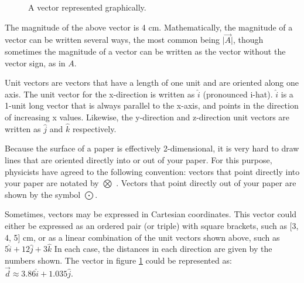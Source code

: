 \begin{figure}[h]
	\caption{A vector represented graphically.} \label{figure:M1}
	\centering
	
\end{figure}


	
	
	



	
	The magnitude of the above vector is 4 cm.  Mathematically, the magnitude of a vector can be written several ways, the most common being $\lvert \vec{A} \rvert$, though sometimes the magnitude of a vector can be written as the vector without the vector sign, as in $A$. 
	
	Unit vectors are vectors that have a length of one unit and are oriented along one axis.  The unit vector for the x-direction is written as $\hat{i}$ (pronounced i-hat).  $\hat{i}$ is a 1-unit long vector that is always parallel to the x-axis, and points in the direction of increasing x values.  Likewise, the y-direction and z-direction unit vectors are written as $\hat{j}$ and $\hat{k}$ respectively.  
	
	
	Because the surface of a paper is effectively 2-dimensional, it is very hard to draw lines that are oriented directly into or out of your paper. For this purpose, physicists have agreed to the following convention: vectors that point directly into your paper are notated by $\bigotimes$ .  Vectors that point directly out of your paper are shown by the symbol $\bigodot$.  
	
	Sometimes, vectors may be expressed in Cartesian coordinates.  This vector could either be expressed as an ordered pair (or triple) with square brackets, such as [3, 4, 5] cm, or as a linear combination of the unit vectors shown above, such as $5\hat{i} + 12 \hat{j} + 3 \hat{k}$  In each case, the distances in each direction are given by the numbers shown.  The vector in figure \ref{figure:M1} could be represented as: \color{blue} $\vec{d}  \approx 3.86 \hat{i} + 1.035 \hat{j}$.  \color{black}
	
